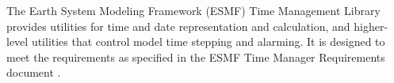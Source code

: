 

The Earth System Modeling Framework (ESMF) Time Management Library
provides utilities for time and date representation and calculation,
and higher-level utilities that control model time stepping and alarming.
It is designed to meet the requirements as specified in the ESMF Time
Manager Requirements document \cite{timemgr_req}.

